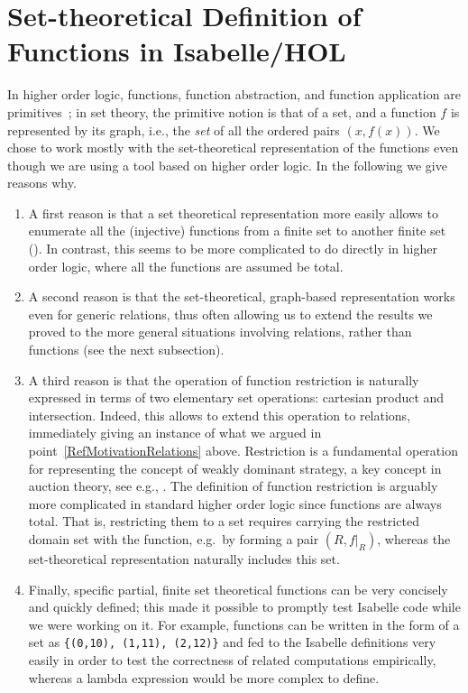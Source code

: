 \documentclass[
]{llncs}
\newcommand{\hol}{higher order logic}
\newcommand{\I}{Isabelle}
\begin{document}
\section{Set-theoretical Definition of Functions in \I{}/HOL}
\label{RefFuncAsGraph}
In \hol{}, functions, function abstraction, and function application are primitives~\cite{bowen1994z};
in set theory, the primitive notion is that of a set, and a function $f$ is represented by its graph, i.e., the \emph{set} of all the ordered pairs $\left( x, f\left( x \right) \right)$.
We chose to work mostly with the set-theoretical representation of the functions even though we are using a tool based on \hol{}. In the following we give reasons why.
\begin{enumerate}
\item
\label{RefMotivationEnumeration}
A first reason is that a set theoretical representation more easily allows to enumerate all the (injective) functions from a finite set to another finite set (\cite{CKLR:SoundCombVickCode13}).
In contrast, this seems to be more complicated to do directly in \hol, where all the functions are assumed be total.
\item
\label{RefMotivationRelations}
A second reason is that the set-theoretical, graph-based representation works even for generic relations, thus often allowing us to extend the results we proved to the more general situations involving relations, rather than functions (see the next subsection).
\item
\label{RefMotivationRestriction}
A third reason is that the operation of function restriction is naturally expressed in terms of two elementary set operations: cartesian product and intersection. Indeed, this allows to extend this operation to relations, immediately giving an instance of what we argued in point~\eqref{RefMotivationRelations} above.
Restriction is a fundamental operation for representing the concept of weakly dominant strategy, a key concept in auction theory, see e.g., \cite[proposition~2]{mas-04}.
The definition of function restriction is arguably more complicated in standard \hol{} since functions are always total. That is, restricting them to a set requires carrying the restricted domain set with the function, e.g.\ by forming a pair $(R, f|_R)$, whereas the set-theoretical representation naturally includes this set.
\item
Finally, specific partial, finite set theoretical functions can be very concisely and quickly defined; this made it possible to  prompt\-ly test \I{} code while we were working on it.
For example, functions can be written in the form of a set as \verb|{(0,10), (1,11), (2,12)}|  and fed to the \I{} definitions very easily in order to test the correctness of related computations empirically, whereas a lambda expression would be more complex to define.
\end{enumerate}
\end{document}
